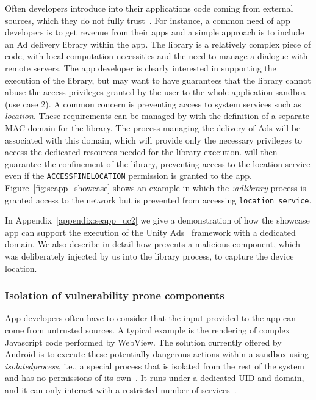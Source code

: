 Often developers introduce into their applications code coming from
external sources, which they do not fully trust~\cite{seapp_7958574,
  seapp_10.1145/2414456.2414498, seapp_demetriou2016free}.  For
instance, a common need of app developers is to get revenue from their
apps and a simple approach is to include an Ad delivery library within
the app.  The library is a relatively complex piece of code, with
local computation necessities and the need to manage a dialogue with
remote servers.  The app developer is clearly interested in supporting
the execution of the library, but may want to have guarantees that the
library cannot abuse the access privileges granted by the user to the
whole application sandbox (use case 2).  A common concern is
preventing access to system services such as {\em location}.  These
requirements can be managed by \seapp with the definition of a separate
MAC domain for the library.  The process managing the delivery of Ads
will be associated with this domain, which will provide only the
necessary privileges to access the dedicated resources needed for the
library execution.  \sel will then guarantee the confinement of the
library, preventing access to the location service even if the
\texttt{ACCESS\textunderscore FINE\textunderscore LOCATION} permission
is granted to the app.  Figure~\ref{fig:seapp_showcase} shows an
example in which the {\em :adlibrary} process is granted access to the
network but is prevented from accessing \texttt{location service}.

In Appendix~\ref{appendix:seapp_uc2} we give a demonstration of how
the showcase app can support the execution of the Unity
Ads~\cite{seapp_unityads} framework with a dedicated \sel domain. We
also describe in detail how \seapp prevents a malicious component, which
was deliberately injected by us into the library process, to capture
the device location.


\subsubsection{Isolation of vulnerability prone
  components}\label{sect:seapp_int_comp_isolation}

App developers often have to consider that the input provided to the
app can come from untrusted sources.  A typical example is the
rendering of complex Javascript code performed by WebView.  The
solution currently offered by Android is to execute these potentially
dangerous actions within a sandbox using {\em isolatedprocess}, i.e.,
a special process that is isolated from the rest of the system and has
no permissions of its own~\cite{seapp_isolatedprocess_perm}.  It runs
under a dedicated UID and \sel domain, and it can only interact with a
restricted number of services~\cite{seapp_isolated_app_te}.

